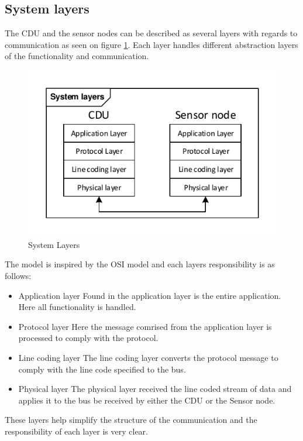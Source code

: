 \subsection{System layers}
The CDU and the sensor nodes can be described as several layers with regards to communication as seen on figure \ref{fig:systemlayers}. Each layer handles different abstraction layers of the functionality and communication. 
\begin{figure}[H]
	\centering
	\includegraphics[width=.6\textwidth]{billeder/11ProjectDescription/System_Layers}
	\caption{System Layers}
	\label{fig:systemlayers}
\end{figure}
The model is inspired by the OSI model and each layers responsibility is as follows:
\begin{itemize}
	\item Application layer
	\subitem Found in the application layer is the entire application. Here all functionality is handled.
	\item Protocol layer
	\subitem Here the message comrised from the application layer is processed to comply with the protocol.
	\item Line coding layer
	\subitem The line coding layer converts the protocol message to comply with the line code specified to the bus.
	\item Physical layer
	\subitem The physical layer received the line coded stream of data and applies it to the bus be received by either the CDU or the Sensor node.
\end{itemize}
These layers help simplify the structure of the communication and the responsibility of each layer is very clear.
